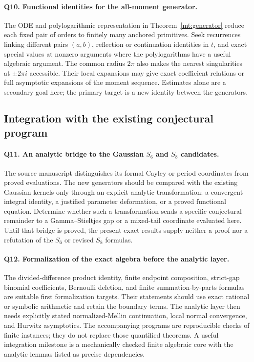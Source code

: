 \documentclass[11pt,letterpaper]{article}
\numberwithin{equation}{section}
\theoremstyle{plain}
\theoremstyle{definition}
\theoremstyle{remark}
\begin{document}
\paragraph{Q10. Functional identities for the all-moment generator.}
The ODE and polylogarithmic representation in
Theorem~\ref{mt:generator} reduce each fixed pair of orders to
finitely many anchored primitives. Seek recurrences linking different
pairs $(a,b)$, reflection or continuation identities in $t$, and exact
special values at nonzero arguments where the polylogarithms have a
useful algebraic argument. The common radius $2\pi$ also makes the
nearest singularities at $\pm2\pi i$ accessible. Their local
expansions may give exact coefficient relations or full asymptotic
expansions of the moment sequence. Estimates alone are a secondary
goal here; the primary target is a new identity between the generators.

\subsection{Integration with the existing conjectural program}

\paragraph{Q11. An analytic bridge to the Gaussian $S_6$ and $S_8$ candidates.}
The source manuscript distinguishes its formal Cayley or period
coordinates from proved evaluations. The new generators should be
compared with the existing Gaussian kernels only through an explicit
analytic transformation: a convergent integral identity, a justified
parameter deformation, or a proved functional equation. Determine
whether such a transformation sends a specific conjectural remainder
to a Gamma--Stieltjes gap or a mixed-tail coordinate evaluated here.
Until that bridge is proved, the present exact results supply neither
a proof nor a refutation of the $S_6$ or revised $S_8$ formulas.

\paragraph{Q12. Formalization of the exact algebra before the analytic layer.}
The divided-difference product identity, finite endpoint composition,
strict-gap binomial coefficients, Bernoulli deletion, and finite
summation-by-parts formulas are suitable first formalization targets.
Their statements should use exact rational or symbolic arithmetic and
retain the boundary terms. The analytic layer then needs explicitly
stated normalized-Mellin continuation, local normal convergence,
and Hurwitz asymptotics. The accompanying programs are reproducible
checks of finite instances; they do not replace those quantified
theorems. A useful integration milestone is a mechanically checked
finite algebraic core with the analytic lemmas listed as precise
dependencies.
\end{document}
